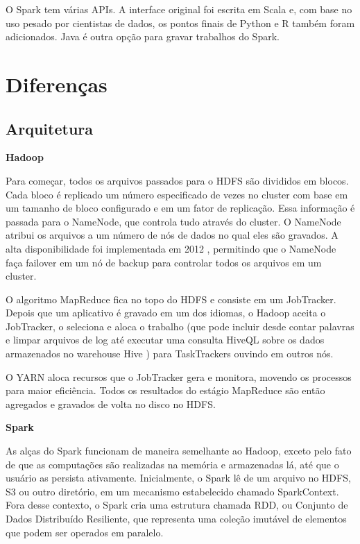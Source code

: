 O Spark tem várias APIs. A interface original foi escrita em Scala e, com base no uso pesado por cientistas de dados, os pontos finais de Python e R também foram adicionados. Java é outra opção para gravar trabalhos do Spark.

\section{Diferenças}
\label{sec:dif}

\subsection{Arquitetura}
\label{sec:arq} 
\noindent\textbf{Hadoop}

Para começar, todos os arquivos passados para o HDFS são divididos em blocos. Cada bloco é replicado um número especificado de vezes no cluster com base em um tamanho de bloco configurado e em um fator de replicação. Essa informação é passada para o NameNode, que controla tudo através do cluster. O NameNode atribui os arquivos a um número de nós de dados no qual eles são gravados. A alta disponibilidade foi implementada em 2012 , permitindo que o NameNode faça failover em um nó de backup para controlar todos os arquivos em um cluster.

O algoritmo MapReduce fica no topo do HDFS e consiste em um JobTracker. Depois que um aplicativo é gravado em um dos idiomas, o Hadoop aceita o JobTracker, o seleciona e aloca o trabalho (que pode incluir desde contar palavras e limpar arquivos de log até executar uma consulta HiveQL sobre os dados armazenados no warehouse Hive ) para TaskTrackers ouvindo em outros nós.

O YARN aloca recursos que o JobTracker gera e monitora, movendo os processos para maior eficiência. Todos os resultados do estágio MapReduce são então agregados e gravados de volta no disco no HDFS.

\noindent\textbf{Spark}

As alças do Spark funcionam de maneira semelhante ao Hadoop, exceto pelo fato de que as computações são realizadas na memória e armazenadas lá, até que o usuário as persista ativamente. Inicialmente, o Spark lê de um arquivo no HDFS, S3 ou outro diretório, em um mecanismo estabelecido chamado SparkContext. Fora desse contexto, o Spark cria uma estrutura chamada RDD, ou Conjunto de Dados Distribuído Resiliente, que representa uma coleção imutável de elementos que podem ser operados em paralelo.

